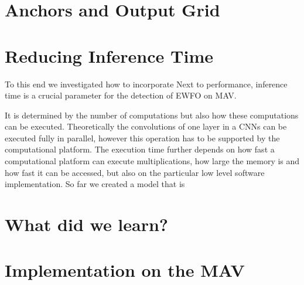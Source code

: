 	\section{Anchors and Output Grid}
		
	\section{Reducing Inference Time}
	
	To this end we investigated how to incorporate 
	Next to performance, inference time is a crucial parameter for the detection of \ac{EWFO} on \ac{MAV}. 
	
	 It is determined by the number of computations but also how these computations can be executed. Theoretically the convolutions of one layer in a \acp{CNN} can be executed fully in parallel, however this operation has to be supported by the computational platform. The execution time further depends on how fast a computational platform can execute multiplications, how large the memory is and how fast it can be accessed, but also on the particular low level software implementation. So far we created a model that is 
	 
	 \section{What did we learn?}
	
	\section{Implementation on the \ac{MAV}}